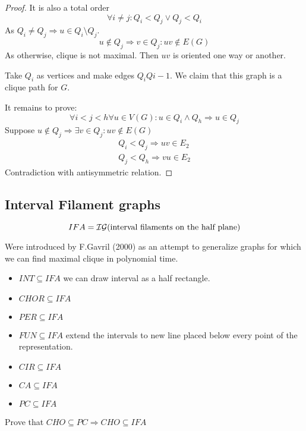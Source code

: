 \begin{proof}
	It is also a total order
	\[ \forall i \ne j: Q_i < Q_j \lor Q_j < Q_i \]
	As $Q_i \ne Q_j \Rightarrow u \in Q_i \setminus Q_j$.
	\[ u \notin Q_j \Rightarrow v \in Q_j: uv \notin E(G) \]
	As otherwise, clique is not maximal.
	Then $uv$ is oriented one way or another.

	Take $Q_i$ as vertices and make edges $Q_{i}Q{i - 1}$.
	We claim that this graph is a clique path for $G$.

	It remains to prove:
	\[ \forall i < j < h \forall u \in V(G): u \in Q_i \land Q_h \Rightarrow u \in Q_j \]
	Suppose $u \notin Q_j \Rightarrow \exists v \in Q_j: uv \notin E(G)$
	\begin{gather*}
		Q_i < Q_j \Rightarrow uv \in E_2 \\
		Q_j < Q_h \Rightarrow vu \in E_2
	\end{gather*}
	Contradiction with antisymmetric relation.
\end{proof}

\subsection{Interval Filament graphs}

\begin{definition}
	\[ IFA = \operatorname{\mathcal{IG}}(\text{interval filaments on the half plane}) \]

	Were introduced by F.Gavril (2000) as an attempt to generalize graphs for which we can find maximal clique in polynomial time.
\end{definition}

\begin{observation}
	\begin{itemize}
		\item $INT \subseteq IFA$ we can draw interval as a half rectangle.
		\item $CHOR \subseteq IFA$
		\item $PER \subseteq IFA$
		\item $FUN \subseteq IFA$ extend the intervals to new line placed below every point of the representation.
		\item $CIR \subseteq IFA$
		\item $CA \subseteq IFA$
		\item $PC \subseteq IFA$
	\end{itemize}
\end{observation}

\begin{exercise}
	Prove that $CHO \subseteq PC \Rightarrow CHO \subseteq IFA$
\end{exercise}

